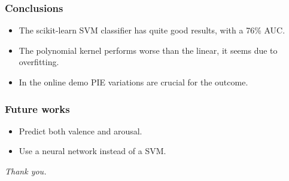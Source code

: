 \documentclass{beamer}
\begin{document}
\begin{frame}
    \frametitle{Conclusions}
    \begin{itemize}
    \item The scikit-learn SVM classifier has quite good results, with a 76\% AUC.
    \item The polynomial kernel performs worse than the linear, it seems due to overfitting.
    \item In the online demo PIE variations are crucial for the outcome.
    \end{itemize}
\end{frame}

\begin{frame}
    \frametitle{Future works}
    \begin{itemize}
        \item Predict both valence and arousal.
        \item Use a neural network instead of a SVM.
    \end{itemize}
\end{frame}

\begin{frame}
    \begin{center}
        \Large{\textit{Thank you.}}        
    \end{center}
\end{frame}
\end{document}
